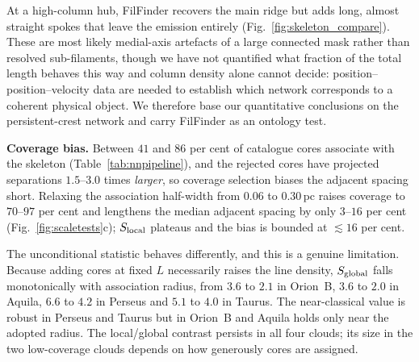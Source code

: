 \documentclass[usenatbib,twoside,twocolumn]{mnras}
\begin{document}
At a high-column hub, FilFinder recovers the main ridge but adds long, almost straight spokes that leave the emission entirely (Fig.~\ref{fig:skeleton_compare}). These are most likely medial-axis artefacts of a large connected mask rather than resolved sub-filaments, though we have not quantified what fraction of the total length behaves this way and column density alone cannot decide: position--position--velocity data are needed to establish which network corresponds to a coherent physical object. We therefore base our quantitative conclusions on the persistent-crest network and carry FilFinder as an ontology test.

\smallskip\noindent\textbf{Coverage bias.} Between $41$ and $86$ per cent of catalogue cores associate with the skeleton (Table~\ref{tab:nnpipeline}), and the rejected cores have projected separations $1.5$--$3.0$ times \emph{larger}, so coverage selection biases the adjacent spacing short. Relaxing the association half-width from $0.06$ to $0.30$\,pc raises coverage to $70$--$97$ per cent and lengthens the median adjacent spacing by only $3$--$16$ per cent (Fig.~\ref{fig:scaletests}c); $S_{\rm local}$ plateaus and the bias is bounded at $\lesssim16$ per cent.

The unconditional statistic behaves differently, and this is a genuine limitation. Because adding cores at fixed $L$ necessarily raises the line density, $S_{\rm global}$ falls monotonically with association radius, from $3.6$ to $2.1$ in Orion~B, $3.6$ to $2.0$ in Aquila, $6.6$ to $4.2$ in Perseus and $5.1$ to $4.0$ in Taurus. The near-classical value is robust in Perseus and Taurus but in Orion~B and Aquila holds only near the adopted radius. The local/global contrast persists in all four clouds; its size in the two low-coverage clouds depends on how generously cores are assigned.
\end{document}
